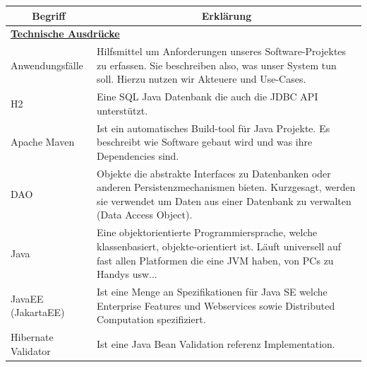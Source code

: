\documentclass[enabledeprecatedfontcommands,fontsize=12pt,paper=a4,twoside]{scrartcl}
\begin{document}
\begin{longtable}[c]{|p{7cm}|p{8cm}|}
\hline
\multicolumn{1}{|c|}{\textbf{Begriff}} & \multicolumn{1}{c|}{\textbf{Erklärung}}                                                                                                                                                                                 \\ \hline
\endhead
%
\multicolumn{2}{|l|}{{\ul \textbf{Technische Ausdrücke}}}                                                                                                                                                                                                        \\ \hline
Anwendungsfälle                        & Hilfsmittel um Anforderungen unseres Software-Projektes zu erfassen. Sie beschreiben also, was unser System tun soll. Hierzu nutzen wir Akteuere und Use-Cases.                                                         \\ \hline
H2                                     & Eine SQL Java Datenbank die auch die JDBC API unterstützt.                                                                                                                                                              \\ \hline
Apache Maven                           & Ist ein automatisches Build-tool für Java Projekte. Es beschreibt wie Software gebaut wird und was ihre Dependencies sind.                                                                                              \\ \hline
DAO                                    & Objekte die abstrakte Interfaces zu Datenbanken oder anderen Persistenzmechanismen bieten. Kurzgesagt, werden sie verwendet um Daten aus einer Datenbank zu verwalten (Data Access Object).                             \\ \hline
Java                                   & Eine objektorientierte Programmiersprache, welche klassenbasiert, objekte-orientiert ist. Läuft universell auf fast allen Platformen die eine JVM haben, von PCs zu Handys usw...                                       \\ \hline
JavaEE (JakartaEE)                     & Ist eine Menge an Spezifikationen für Java SE welche Enterprise Features und Webservices sowie Distributed Computation spezifiziert.                                                                                    \\ \hline
Hibernate Validator                    & Ist eine Java Bean Validation referenz Implementation.                                                                                                                                                                  \\ \hline

\end{longtable}
\end{document}
